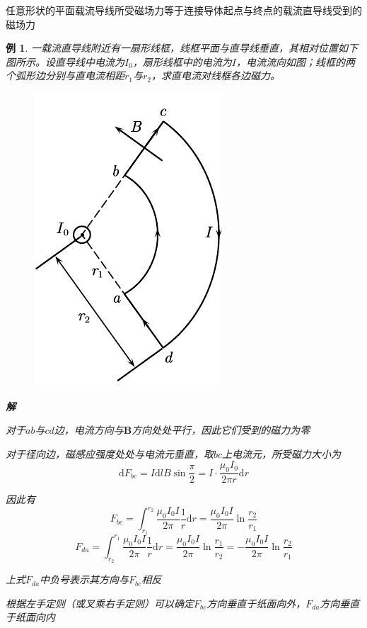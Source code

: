\documentclass[12pt, a4paper, twoside]{ctexbook}
\newtheorem{example}[theorem]{例}
\begin{document}
任意形状的平面载流导线所受磁场力等于连接导体起点与终点的载流直导线受到的磁场力

\begin{example}
    一载流直导线附近有一扇形线框，线框平面与直导线垂直，其相对位置如下图所示。设直导线中电流为$I_0$，扇形线框中的电流为$I$，电流流向如图；线框的两个弧形边分别与直电流相距$r_1$与$r_2$，求直电流对线框各边磁力。
    \begin{figure}[H]
        \centerline{\includegraphics[scale=0.8]{CH10EX06.pdf}}
    \end{figure}

    \noindent\textbf{解}

    对于$ab$与$cd$边，电流方向与$\boldsymbol{B}$方向处处平行，因此它们受到的磁力为零

    对于径向边，磁感应强度处处与电流元垂直，取$bc$上电流元，所受磁力大小为
    $$
    \mathrm{d}F_{bc}=I\mathrm{d}lB\sin\frac{\pi}{2}=I\cdot\frac{\mu_0I_0}{2\pi r}\mathrm{d}r
    $$

    因此有
    $$
    F_{bc}=\int_{r_1}^{r_2}\frac{\mu_0I_0I}{2\pi}\frac{1}{r}\mathrm{d}r=\frac{\mu_0I_0I}{2\pi}\ln\frac{r_2}{r_1}
    $$
    $$
    F_{da}=\int_{r_2}^{r_1}\frac{\mu_0I_0I}{2\pi}\frac{1}{r}\mathrm{d}r=\frac{\mu_0I_0I}{2\pi}\ln\frac{r_1}{r_2}=-\frac{\mu_0I_0I}{2\pi}\ln\frac{r_2}{r_1}
    $$
    
    上式$F_{da}$中负号表示其方向与$F_{bc}$相反

    根据左手定则（或叉乘右手定则）可以确定$F_{bc}$方向垂直于纸面向外，$F_{da}$方向垂直于纸面向内
\end{example}
\end{document}
